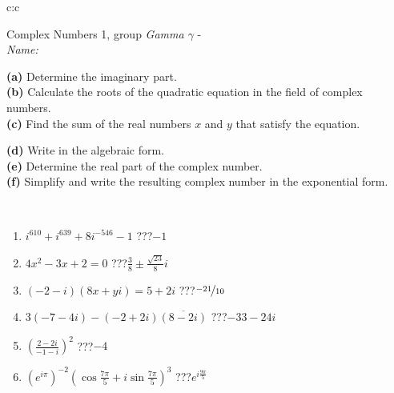 \documentclass[10pt]{report}
\begin{document}
\begin{tabular}{c:c}
\begin{minipage}[c][104.5mm][t]{0.5\linewidth}
\begin{center}
\vspace{5mm}
{\huge Complex Numbers 1, group \textit{Gamma $\gamma$} -}\\[5mm]
\textit{Name:}\phantom{xxxxxxxxxxxxxxxxxxxxxxxxxxxxxxxxxxxxxxxxxxxxxxxxxxxxxxxxxxxxxxxxx}\\[5mm]
\begin{minipage}{0.95\linewidth}
\begin{center}
{\small \begin{minipage}{0.44\textwidth} \raggedright
\textbf{(a)} Determine the imaginary part. \\[1mm]
\textbf{(b)} Calculate the roots of the quadratic equation in the field of complex numbers. \\[1mm]
\textbf{(c)} Find the sum of the real numbers \(x\) and \(y\) that satisfy the equation. \end{minipage} \begin{minipage}{0.54\textwidth}
\textbf{(d)} Write in the algebraic form. \\[1mm]
\textbf{(e)} Determine the real part of the complex number. \\[1mm]
\textbf{(f)} Simplify and write the resulting complex number in the exponential form.
\end{minipage}
} \vspace{3mm}
\end{center}
\end{minipage}
\\[1mm]
\begin{minipage}{0.79\linewidth}
\begin{center}
\begin{varwidth}{\linewidth}
\setlength{\itemsep}{0pt}
\begin{enumerate}
\large
\item $i^{610}+i^{639}+8i^{-546}-1$\quad \dotfill\; ???\;\dotfill \quad $-1$
\item $4x^2-3x+2=0$\quad \dotfill\; ???\;\dotfill \quad $\frac{3}{8} \pm{}\frac{ \sqrt{23}}{8}i$
\item $(-2-i)(8x+yi)=5+2i$\quad \dotfill\; ???\;\dotfill \quad $\nicefrac{-21}{10}$
\item $3(-7-4i)-(-2+2i)\overline{(8-2i)}$\quad \dotfill\; ???\;\dotfill \quad $-33-24i$
\item $\left(\frac{2-2i}{-1-i}\right)^2$\quad \dotfill\; ???\;\dotfill \quad $-4$
\item $\left(e^{i\pi}\right)^{-2}\left(\cos{\frac{7\pi}{5}}+i\sin{\frac{7\pi}{5}}\right)^{3}$\quad \dotfill\; ???\;\dotfill \quad $e^{i\frac{9\pi}{5}}$

\end{enumerate}
\end{varwidth}
\end{center}
\end{minipage}
\end{center}
\end{minipage}
\end{tabular}
\end{document}
